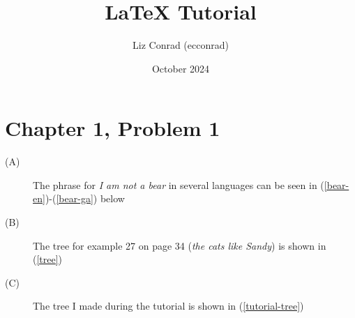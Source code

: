 \documentclass{article}
\title{LaTeX Tutorial}
\author{Liz Conrad (ecconrad)}
\date{October 2024}
\begin{document}
\maketitle


\section*{Chapter 1, Problem 1}

\begin{description}
    
    \item[(A)] The phrase for \textit{I am not a bear} in several languages can be seen in (\ref{bear-en})-(\ref{bear-ga}) below
    
    
    \item[(B)] The tree for example 27 on page 34 (\textit{the cats like Sandy}) is shown in (\ref{tree})
    
    \item[(C)] The tree I made during the tutorial is shown in (\ref{tutorial-tree})
    
\end{description}
\end{document}
